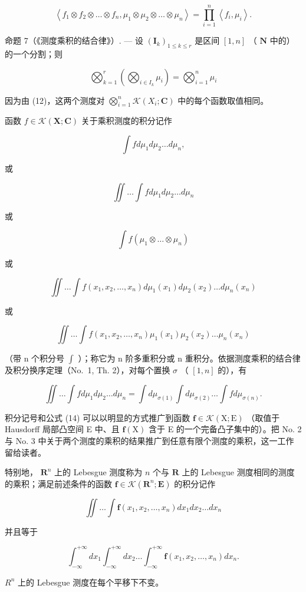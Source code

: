 \[
\left\langle f _ {1} \otimes f _ {2} \otimes \dots \otimes f _ {n}, \mu_ {1} \otimes \mu_ {2} \otimes \dots \otimes \mu_ {n} \right\rangle = \prod_ {i = 1} ^ {n} \left\langle f _ {i}, \mu_ {i} \right\rangle .\tag{12}
\]

命题 7（《测度乘积的结合律》）. --- 设 \((\mathbf{I}_k)_{1 \leqslant k \leqslant r}\) 是区间 \([1, n]\) （ \(\mathbf{N}\) 中的）的一个分割；则

\[
\bigotimes_ {k = 1} ^ {r} \left(\bigotimes_ {i \in I _ {k}} \mu_ {i}\right) = \bigotimes_ {i = 1} ^ {n} \mu_ {i}\tag{13}
\]

因为由 (12)，这两个测度对 \(\bigotimes_ {i = 1} ^ {n} \mathcal{K}(X_{i}; \mathbf{C})\) 中的每个函数取值相同。

函数 \(f \in \mathcal{K}(\mathbf{X};\mathbf{C})\) 关于乘积测度的积分记作

\[
\int f d \mu_ {1} d \mu_ {2} \dots d \mu_ {n},
\]

或

\[
\iint \ldots \int f d \mu_ {1} d \mu_ {2} \ldots d \mu_ {n}
\]

或

\[
\int f (\mu_ {1} \otimes \dots \otimes \mu_ {n})
\]

或

\[
\iint \dots \int f (x _ {1}, x _ {2}, \dots , x _ {n}) d \mu_ {1} (x _ {1}) d \mu_ {2} (x _ {2}) \dots d \mu_ {n} (x _ {n})
\]

或

\[
\iint \dots \int f (x _ {1}, x _ {2}, \dots , x _ {n}) \mu_ {1} (x _ {1}) \mu_ {2} (x _ {2}) \dots \mu_ {n} (x _ {n})
\]

（带 n 个积分号 \(\int\) ）；称它为 n 阶多重积分或 n 重积分。依据测度乘积的结合律及积分换序定理（No.~1, Th. 2），对每个置换 \(\sigma\) （ \([1,n]\) 的），有

\[
\iint \dots \int f d \mu_ {1} d \mu_ {2} \dots d \mu_ {n} = \int d \mu_ {\sigma (1)} \int d \mu_ {\sigma (2)} \dots \int f d \mu_ {\sigma (n)}.\tag{14}
\]

积分记号和公式 (14) 可以以明显的方式推广到函数 \(\mathbf{f} \in \mathcal{K}(\mathrm{X};\mathrm{E})\) （取值于 Hausdorff 局部凸空间 E 中、且 \(\mathbf{f}(\mathrm{X})\) 含于 E 的一个完备凸子集中的）。把 No. 2 与 No. 3 中关于两个测度的乘积的结果推广到任意有限个测度的乘积，这一工作留给读者。

特别地， \(\mathbf{R}^n\) 上的 Lebesgue 测度称为 \(n\) 个与 \(\mathbf{R}\) 上的 Lebesgue 测度相同的测度的乘积；满足前述条件的函数 \(\mathbf{f} \in \mathcal{K}(\mathbf{R}^n; \mathbf{E})\) 的积分记作

\[
\iint \dots \int \mathbf {f} (x _ {1}, x _ {2}, \dots , x _ {n}) d x _ {1} d x _ {2} \dots d x _ {n}
\]

并且等于

\[
\int_ {- \infty} ^ {+ \infty} d x _ {1} \int_ {- \infty} ^ {+ \infty} d x _ {2} \dots \int_ {- \infty} ^ {+ \infty} \mathbf {f} (x _ {1}, x _ {2}, \dots , x _ {n}) d x _ {n}.
\]

\(R^{n}\) 上的 Lebesgue 测度在每个平移下不变。
